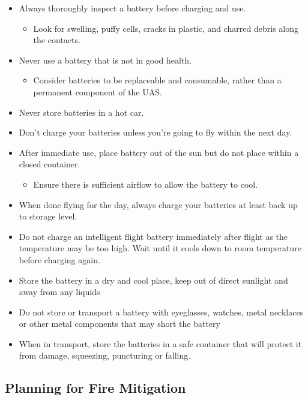 \documentclass[
  12pt,
]{book}
\providecommand{\tightlist}{%
  \setlength{\itemsep}{0pt}\setlength{\parskip}{0pt}}
\begin{document}
\begin{itemize}
\item
  Always thoroughly inspect a battery before charging and use.

  \begin{itemize}
  \tightlist
  \item
    Look for swelling, puffy cells, cracks in plastic, and charred debris along the contacts.
  \end{itemize}
\item
  Never use a battery that is not in good health.

  \begin{itemize}
  \tightlist
  \item
    Consider batteries to be replaceable and consumable, rather than a permanent component of the UAS.
  \end{itemize}
\item
  Never store batteries in a hot car.
\item
  Don't charge your batteries unless you're going to fly within the next day.
\item
  After immediate use, place battery out of the sun but do not place within a closed container.

  \begin{itemize}
  \tightlist
  \item
    Ensure there is sufficient airflow to allow the battery to cool.
  \end{itemize}
\item
  When done flying for the day, always charge your batteries at least back up to storage level.
\item
  Do not charge an intelligent flight battery immediately after flight as the temperature may be too high. Wait until it cools down to room temperature before charging again.
\item
  Store the battery in a dry and cool place, keep out of direct sunlight and away from any liquids
\item
  Do not store or transport a battery with eyeglasses, watches, metal necklaces or other metal components that may short the battery
\item
  When in transport, store the batteries in a safe container that will protect it from damage, squeezing, puncturing or falling.
\end{itemize}

\hypertarget{planning-for-fire-mitigation}{%
\subsection{Planning for Fire Mitigation}\label{planning-for-fire-mitigation}}
\end{document}
